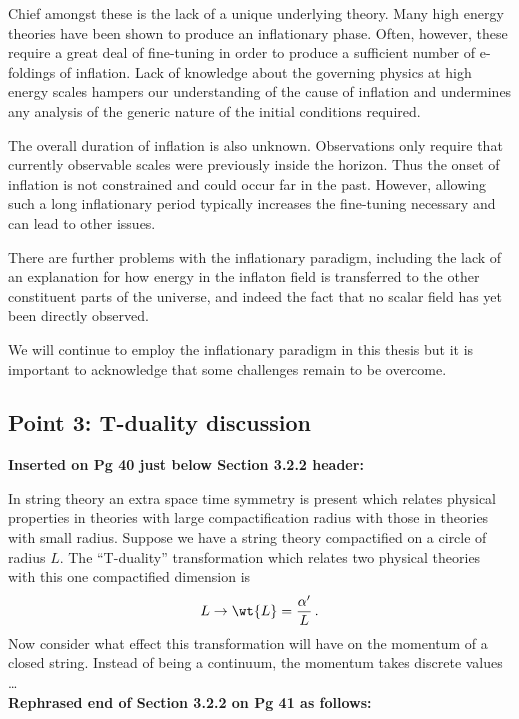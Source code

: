 Chief amongst these is the lack of a unique underlying theory. Many high energy theories have been
shown to produce an inflationary phase. Often, however, these require a great deal of fine-tuning
in order to produce a sufficient number of e-foldings of inflation. Lack of knowledge about the
governing physics at high energy scales hampers our understanding of the cause of inflation and
undermines any analysis of the generic nature of the initial conditions required.

The overall duration of inflation is also unknown. Observations only require that currently
observable scales were previously inside the horizon. Thus the onset of inflation is not
constrained and could occur far in the past. However, allowing such a long inflationary period
typically increases the fine-tuning necessary and can lead to other issues. 

There are further problems with the inflationary paradigm, including the lack of an explanation for
how energy in the inflaton field is transferred to the other constituent parts of the universe, and
indeed the fact that no scalar field has yet been directly observed.

We will continue to employ the inflationary paradigm in this thesis but it is important to
acknowledge that some challenges remain to be overcome.

\subsection{Point 3: T-duality discussion}
\textbf{Inserted on Pg 40 just below Section 3.2.2 header:}

In string theory an extra space time symmetry is present which relates physical properties in
theories with large compactification radius with those in theories with small radius. 
Suppose we have a string theory compactified on a circle of radius $L$. The ``T-duality''
transformation which relates two physical theories with this one compactified dimension is
% 
\begin{equation}
\label{eq:tdualtransform-corr}
 L \rightarrow \wt{L} = \frac{\alpha'}{L}\,.
\end{equation}
% 
Now consider what effect this transformation will have on the momentum of a closed string. Instead
of being a continuum, the momentum takes discrete values \ldots
\\

\textbf{Rephrased end of Section 3.2.2 on Pg 41 as follows:}

